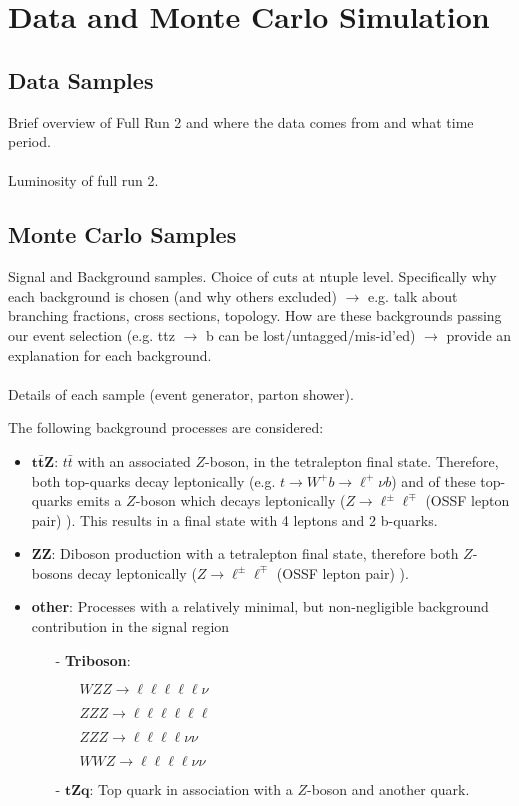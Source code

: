 
\section{Data and Monte Carlo Simulation}
\subsection{Data Samples}
Brief overview of Full Run 2 and where the data comes from and what time period.\\\\
Luminosity of full run 2. 

\subsection{Monte Carlo Samples}
Signal and Background samples. Choice of cuts at ntuple level. Specifically why each background is chosen (and why others excluded) $\rightarrow$ e.g. talk about branching fractions, cross sections, topology. How are these backgrounds passing our event selection (e.g. ttz $\rightarrow$ b can be lost/untagged/mis-id'ed) $\rightarrow$ provide an explanation for each background.\\\\
Details of each sample (event generator, parton shower).


The following background processes are considered:
\begin{itemize}
	\item $\mathbf{t \bar{t} Z}$: $t \bar{t} $  with an associated $Z$-boson, in the tetralepton final state. Therefore, both top-quarks decay leptonically (e.g. $t \rightarrow W^+ b \rightarrow \ell^+ \nu b$) and of these top-quarks emits a $Z$-boson which decays leptonically ($Z \rightarrow \ell^\pm \ell^\mp$ (OSSF lepton pair) ). This results in a final state with 4 leptons and 2 b-quarks.
	\item $\mathbf{ZZ}$: Diboson production with a tetralepton final state, therefore both $Z$-bosons decay leptonically ($Z \rightarrow \ell^\pm \ell^\mp$ (OSSF lepton pair) ).
	\item \textbf{other}: Processes with a relatively minimal, but non-negligible background contribution in the \tWZ signal region 
	\begin{itemize}
	\item [-] \textbf{Triboson}: 
	\begin{itemize}
		\item [] $WZZ \rightarrow \ell\ell\ell\ell\ell \nu$
		\item [] $ZZZ \rightarrow \ell \ell \ell\ell\ell\ell$
		\item [] $ZZZ \rightarrow \ell\ell\ell\ell\nu\nu$
		\item [] $WWZ \rightarrow \ell\ell\ell\ell\nu\nu$
	\end{itemize}
	\item [-] $\mathbf{tZq}$: Top quark in association with a $Z$-boson and another quark.
	 
	\end{itemize}
\end{itemize}




